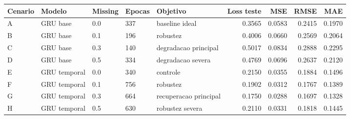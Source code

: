 \begin{tabular}{lllllrrrr}
\hline
Cenario & Modelo & Missing & Epocas & Objetivo & Loss teste & MSE & RMSE & MAE \\
\hline
A & GRU base & 0.0 & 337 & baseline ideal & 0.3565 & 0.0583 & 0.2415 & 0.1970 \\
B & GRU base & 0.1 & 196 & robustez & 0.4006 & 0.0660 & 0.2569 & 0.2064 \\
C & GRU base & 0.3 & 140 & degradacao principal & 0.5017 & 0.0834 & 0.2888 & 0.2295 \\
D & GRU base & 0.5 & 334 & degradacao severa & 0.4769 & 0.0696 & 0.2637 & 0.2120 \\
E & GRU temporal & 0.0 & 340 & controle & 0.2150 & 0.0355 & 0.1884 & 0.1496 \\
F & GRU temporal & 0.1 & 756 & robustez & 0.1902 & 0.0312 & 0.1767 & 0.1389 \\
G & GRU temporal & 0.3 & 664 & recuperacao principal & 0.1750 & 0.0288 & 0.1697 & 0.1328 \\
H & GRU temporal & 0.5 & 630 & robustez severa & 0.2110 & 0.0331 & 0.1818 & 0.1445 \\
\hline
\end{tabular}
